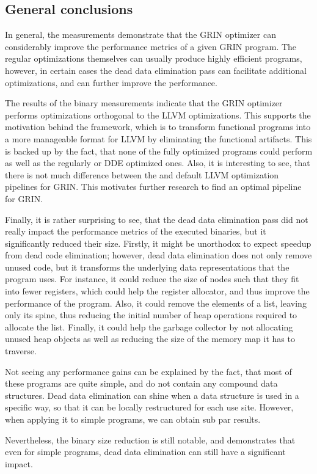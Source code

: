 \documentclass[main.tex]{subfiles}
\begin{document}
	\subsection{General conclusions}
	
	In general, the measurements demonstrate that the GRIN optimizer can considerably improve the performance metrics of a given GRIN program. The regular optimizations themselves can usually produce highly efficient programs, however, in certain cases the dead data elimination pass can facilitate additional optimizations, and can further improve the performance.
	
	The results of the binary measurements indicate that the GRIN optimizer performs optimizations orthogonal to the LLVM optimizations. This supports the motivation behind the framework, which is to transform functional programs into a more manageable format for LLVM by eliminating the functional artifacts. This is backed up by the fact, that none of the fully optimized  programs could perform as well as the regularly or DDE optimized ones. Also, it is interesting to see, that there is not much difference between the  and  default LLVM optimization pipelines for GRIN. This motivates further research to find an optimal pipeline for GRIN. 
	
	Finally, it is rather surprising to see, that the dead data elimination pass did not really impact the performance metrics of the executed binaries, but it significantly reduced their size. Firstly, it might be unorthodox to expect speedup from dead code elimination; however, dead data elimination does not only remove unused code, but it transforms the underlying data representations that the program uses. For instance, it could reduce the size of nodes such that they fit into fewer registers, which could help the register allocator, and thus improve the performance of the program. Also, it could remove the elements of a list, leaving only its spine, thus reducing the initial number of heap operations required to allocate the list. Finally, it could help the garbage collector by not allocating unused heap objects as well as reducing the size of the memory map it has to traverse.
	
	Not seeing any performance gains can be explained by the fact, that most of these programs are quite simple, and do not contain any compound data structures. Dead data elimination can shine when a data structure is used in a specific way, so that it can be locally restructured for each use site. However, when applying it to simple programs, we can obtain sub par results. 
	
	Nevertheless, the binary size reduction is still notable, and demonstrates that even for simple programs, dead data elimination can still have a significant impact.
\end{document}
